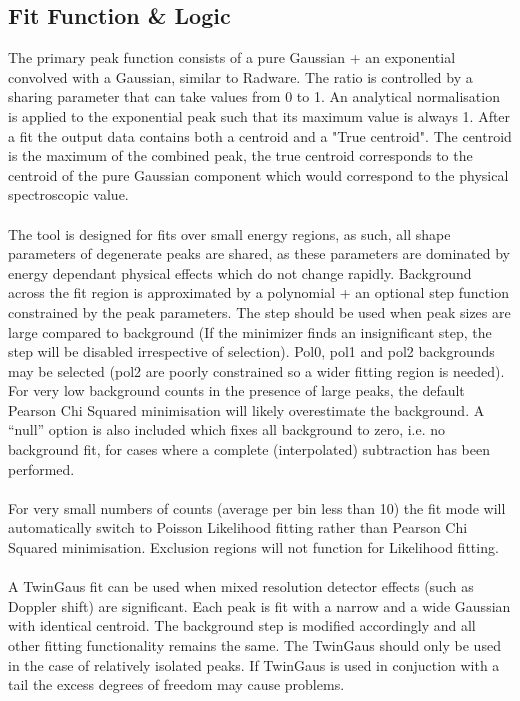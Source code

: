\documentclass[a4paper,10pt]{article}
\begin{document}
\subsection{Fit Function \& Logic}
The primary peak function consists of a pure Gaussian + an exponential convolved with a Gaussian, similar to Radware. The ratio is controlled by a sharing parameter that can take values from 0 to 1. An analytical normalisation is applied to the exponential peak such that its maximum value is always 1. After a fit the output data contains both a centroid and a "True centroid". The centroid is the maximum of the combined peak, the true centroid corresponds to the centroid of the pure Gaussian component which would correspond to the physical spectroscopic value.  
\\
\\
The tool is designed for fits over small energy regions, as such, all shape parameters of degenerate peaks are shared, as these parameters are dominated by energy dependant physical effects which do not change rapidly. Background across the fit region is approximated by a polynomial + an optional step function constrained by the peak parameters. The step should be used when peak sizes are large compared to background (If the minimizer finds an insignificant step, the step will be disabled irrespective of selection).
Pol0, pol1 and pol2 backgrounds may be selected (pol2 are poorly constrained so a wider fitting region is needed).
For very low background counts in the presence of large peaks, the default Pearson Chi Squared minimisation will likely overestimate the background.
A ``null'' option is also included which fixes all background to zero, i.e. no background fit, for cases where a complete (interpolated) subtraction has been performed.
\\
\\ 
For very small numbers of counts (average per bin less than 10) the fit mode will automatically switch to Poisson Likelihood fitting rather than Pearson Chi Squared minimisation. Exclusion regions will not function for Likelihood fitting.
\\
\\
A TwinGaus fit can be used when mixed resolution detector effects (such as Doppler shift) are significant. Each peak is fit with a narrow and a wide Gaussian with identical centroid. The background step is modified accordingly and all other fitting functionality remains the same. The TwinGaus should only be used in the case of relatively isolated peaks.
If TwinGaus is used in conjuction with a tail the excess degrees of freedom may cause problems.
\end{document}
